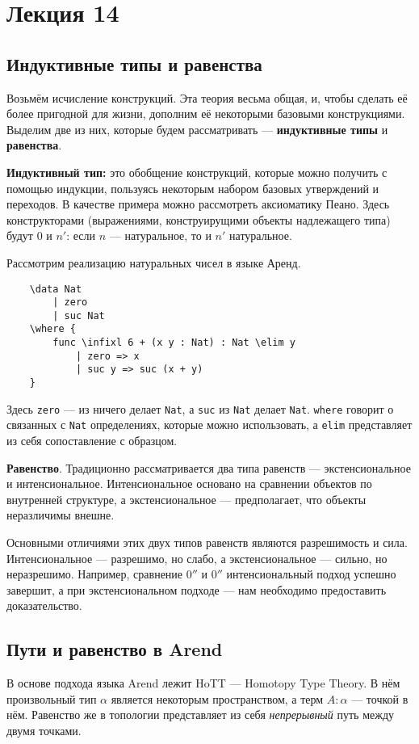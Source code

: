 \section{Лекция 14}

\subsection{Индуктивные типы и равенства}

Возьмём исчисление конструкций. Эта теория весьма общая, и, чтобы сделать её более
пригодной для жизни, дополним её некоторыми базовыми конструкциями. Выделим две из них, которые будем рассматривать
--- \textbf{индуктивные типы} и \textbf{равенства}.

\medskip
\textbf{Индуктивный тип:} это обобщение конструкций, которые можно получить с помощью индукции,
пользуясь некоторым набором базовых утверждений и переходов. В качестве примера можно рассмотреть аксиоматику Пеано.
Здесь конструкторами (выражениями, конструирущими объекты надлежащего типа) будут $0$ и $n'$: если $n$ --- натуральное, то и $n'$ натуральное.

Рассмотрим реализацию натуральных чисел в языке Аренд.
\newpage
\begin{verbatim}
    \data Nat
        | zero
        | suc Nat
    \where {
        func \infixl 6 + (x y : Nat) : Nat \elim y
            | zero => x
            | suc y => suc (x + y)
    }
\end{verbatim}

Здесь \texttt{zero} --- из ничего делает \texttt{Nat}, а \texttt{suc} из \texttt{Nat} делает \texttt{Nat}.
\texttt{where} говорит о связанных с \texttt{Nat} определениях, которые можно использовать, а \texttt{elim} представляет из себя сопоставление с образцом.

\medskip
\textbf{Равенство}. Традиционно рассматривается два типа равенств --- экстенсиональное и интенсиональное.
Интенсиональное основано на сравнении объектов по внутренней структуре, а экстенсиональное --- предполагает, что объекты неразличимы внешне.

Основными отличиями этих двух типов равенств являются разрешимость и сила. Интенсиональное --- разрешимо, но слабо, а экстенсиональное --- сильно, но неразрешимо.
Например, сравнение $0''$ и $0''$ интенсиональный подход успешно завершит, а при экстенсиональном подходе --- нам необходимо предоставить доказательство.

\subsection{Пути и равенство в Arend}
В основе подхода языка Arend лежит HoTT --- Homotopy Type Theory.
В нём произвольный тип $\alpha$ является некоторым пространством, а терм $A : \alpha$ --- точкой в нём.
Равенство же в топологии представляет из себя \textit{непрерывный} путь между двумя точками.


